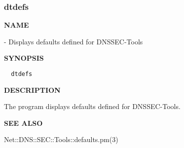 \clearpage

\subsubsection{dtdefs}

{\bf NAME}

 - Displays defaults defined for DNSSEC-Tools

{\bf SYNOPSIS}

\begin{verbatim}
  dtdefs
\end{verbatim}

{\bf DESCRIPTION}

The  program displays defaults defined for DNSSEC-Tools.

{\bf SEE ALSO}

Net::DNS::SEC::Tools::defaults.pm(3)

